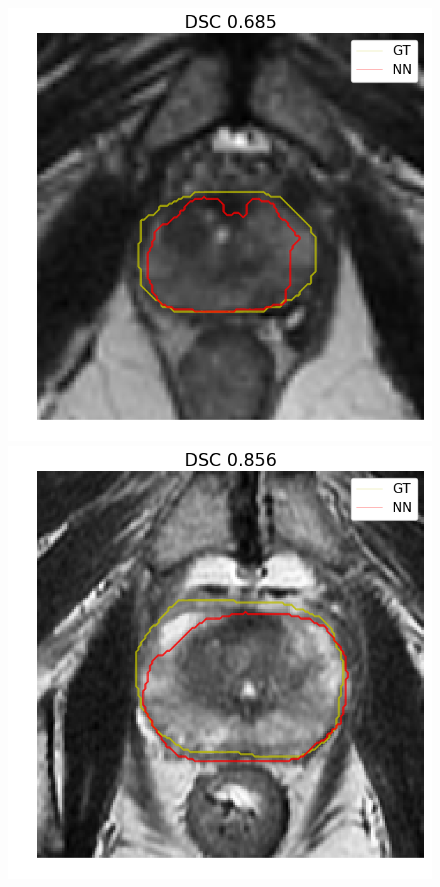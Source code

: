 \begin{figure}[h]
    \includegraphics[totalheight=.2\textheight]{imgs/results/Prostate_GE__GE_yes_ROI_MIN_Case-0518.png}
    \includegraphics[totalheight=.2\textheight]{imgs/results/Prostate_GE__GE_yes_ROI_MEAN_Case-0544.png}

\end{figure}
